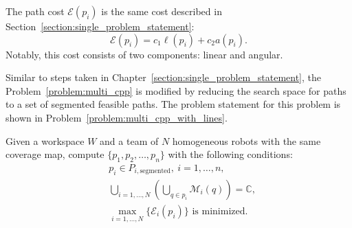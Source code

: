 \documentclass[../main.tex]{subfiles}
\begin{document}
\begin{remark}
	The path cost $\mathcal{E}(p_i)$ is the same cost described in Section~\ref{section:single_problem_statement}:
	\begin{equation}
		\mathcal{E}(p_i)=c_1\ell(p_i)+c_2a(p_i).
	\end{equation}
	Notably, this cost consists of two components: linear and angular. 

\RE
\end{remark}





Similar to steps taken in Chapter~\ref{section:single_problem_statement}, the Problem~\ref{problem:multi_cpp} is modified by reducing the search space for paths to a set of segmented feasible paths. The problem statement for this problem is shown in Problem~\ref{problem:multi_cpp_with_lines}.
\begin{problem}
\label{problem:multi_cpp_with_lines}
	Given a workspace $W$ and a team of $N$ homogeneous robots with the same coverage map, compute $\{p_1,p_2,\ldots,p_n\}$ with the following conditions:
	\begin{equation}
	\begin{aligned}
		& p_i\in P_{i,\text{segmented}},\ i=1,\dots,n,\\
		& \bigcup_{i=1,\dots,N}(\bigcup_{q\in p_i}\mathcal{M}_i(q))=\mathbb{C},\\
		& \max_{i=1,\ldots,N}\{\mathcal{E}_i(p_i)\}\text{ is minimized.}
	\end{aligned}
	\end{equation}
\end{problem}
\end{document}
